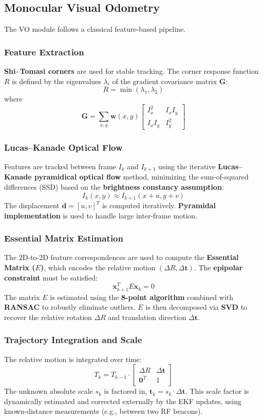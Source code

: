 \documentclass[conference]{IEEEtran}
\begin{document}
\subsection{Monocular Visual Odometry}
The VO module follows a classical feature-based pipeline.

\subsubsection{Feature Extraction}
\textbf{Shi–Tomasi corners} are used for stable tracking. The corner response function $R$ is defined by the eigenvalues $\lambda_i$ of the gradient covariance matrix $\mathbf{G}$:
$$
R = \min(\lambda_1, \lambda_2)
$$
where
$$
\mathbf{G} = \sum_{x,y} \mathbf{w}(x,y) \begin{bmatrix} I_x^2 & I_x I_y \\ I_x I_y & I_y^2 \end{bmatrix}
$$

\subsubsection{Lucas–Kanade Optical Flow}
Features are tracked between frame $I_k$ and $I_{k+1}$ using the iterative \textbf{Lucas–Kanade pyramidical optical flow} method, minimizing the sum-of-squared differences (SSD) based on the \textbf{brightness constancy assumption}:
$$
I_k(x,y) \approx I_{k+1}(x+u, y+v)
$$
The displacement $\mathbf{d} = [u, v]^T$ is computed iteratively. \textbf{Pyramidal implementation} is used to handle large inter-frame motion.

\subsubsection{Essential Matrix Estimation}
The 2D-to-2D feature correspondences are used to compute the \textbf{Essential Matrix ($E$)}, which encodes the relative motion $(\Delta R, \Delta \mathbf{t})$. The \textbf{epipolar constraint} must be satisfied:
$$
\mathbf{x}_{k+1}^T E \mathbf{x}_k = 0
$$
The matrix $E$ is estimated using the \textbf{8-point algorithm} combined with \textbf{RANSAC} to robustly eliminate outliers. $E$ is then decomposed via \textbf{SVD} to recover the relative rotation $\Delta R$ and translation direction $\Delta \mathbf{t}$.

\subsubsection{Trajectory Integration and Scale}
The relative motion is integrated over time:
$$
T_k = T_{k-1} \cdot \begin{bmatrix} \Delta R & \Delta \mathbf{t} \\ \mathbf{0}^T & 1 \end{bmatrix}
$$
The unknown absolute scale $s_k$ is factored in, $\mathbf{t}_k = s_k \cdot \Delta \mathbf{t}$. This scale factor is dynamically estimated and corrected externally by the EKF updates, using known-distance measurements (e.g., between two RF beacons).
\end{document}
